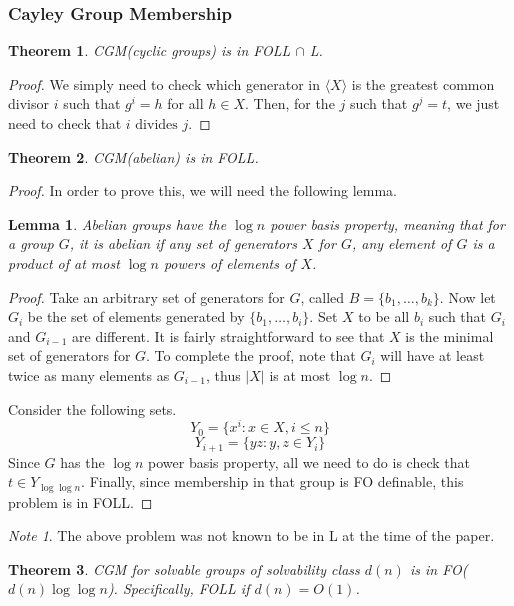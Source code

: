\documentclass[a4paper,12pt]{article}
\theoremstyle{plain}
\newtheorem{theorem}{Theorem}
\newtheorem{lemma}{Lemma}
\theoremstyle{definition}
\theoremstyle{remark}
\newtheorem*{note}{Note}
\begin{document}
\subsubsection{Cayley Group Membership}
\begin{theorem}
  CGM(cyclic groups) is in FOLL $\cap$ L.
\end{theorem}
\begin{proof}
  We simply need to check which generator in $\langle X\rangle$ is the greatest common divisor $i$ such that $g^i=h$ for all $h\in X$. Then, for the $j$ such that $g^j=t$, we just need to check that $i\text{ divides } j$.
\end{proof}
\begin{theorem}
  CGM(abelian) is in FOLL.
\end{theorem}
\begin{proof}
  In order to prove this, we will need the following lemma.
  \begin{lemma}
    Abelian groups have the $\log n$ power basis property, meaning that for a group $G$, it is abelian if any set of generators $X$ for $G$, any element of $G$ is a product of at most $\log n$ powers of elements of $X$.
  \end{lemma}
  \begin{proof}
    Take an arbitrary set of generators for $G$, called $B=\{b_1,\dots,b_k\}$. Now let $G_i$ be the set of elements generated by $\{b_1,\dots,b_i\}$. Set $X$ to be all $b_i$ such that $G_i$ and $G_{i-1}$ are different. It is fairly straightforward to see that $X$ is the minimal set of generators for $G$. To complete the proof, note that $G_i$ will have at least twice as many elements as $G_{i-1}$, thus $|X|$ is at most $\log n$.
  \end{proof}
  Consider the following sets.
  $$Y_0=\{x^i:x\in X,i\leq n\}$$
  $$Y_{i+1}=\{yz:y,z\in Y_i\}$$
  Since $G$ has the $\log n$ power basis property, all we need to do is check that $t\in Y_{\log\log n}$. Finally, since membership in that group is FO definable, this problem is in FOLL.
\end{proof}
\begin{note}
  The above problem was not known to be in L at the time of the paper.
\end{note}
\begin{theorem}
  CGM for solvable groups of solvability class $d(n)$ is in FO($d(n)\log\log n$). Specifically, FOLL if $d(n)=O(1)$.
\end{theorem}
\end{document}
